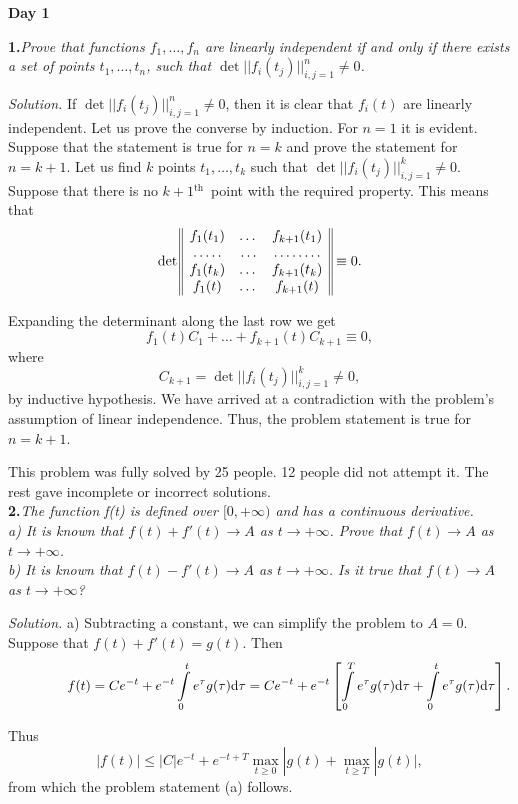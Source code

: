 \documentclass[12pt]{amsart}
\renewcommand{\th}{$^\text{th}$~}
\begin{document}
\centerline{\textbf{Day 1}}

\textbf{1.}\quad\textit{Prove that functions $f_1,\dots,f_n$ are linearly
independent if and only if there exists a set of points $t_1,\dots,t_n$, such
that $\det||f_i(t_j)||_{i,j=1}^n\neq0$.}

\textit{Solution.}
If $\det||f_i(t_j)||_{i,j=1}^n\neq0$, then it is clear that $f_i(t)$ are
linearly independent.
Let us prove the converse by induction.
For $n=1$ it is evident.
Suppose that the statement is true for $n=k$ and prove the statement for
$n=k+1$.
Let us find $k$ points $t_1,\dots,t_k$ such that
$\det||f_i(t_j)||_{i,j=1}^k\neq0$.
Suppose that there is no $k+1$\th point with the required property.
This means that
$$\det
\begin{array}{||ccc||}
f_1(t_1)&\dots&f_{k+1}(t_1)\\
\dotfill&\dotfill&\dotfill\\
f_1(t_k)&\dots&f_{k+1}(t_k)\\
f_1(t)&\dots&f_{k+1}(t)
\end{array}
\equiv0.$$

Expanding the determinant along the last row we get
$$f_1(t)C_1+\dots+f_{k+1}(t)C_{k+1}\equiv0,$$
where
$$C_{k+1}=\det||f_i(t_j)||_{i,j=1}^k\neq0,$$
by inductive hypothesis.
We have arrived at a contradiction with the problem's assumption of linear
independence.
Thus, the problem statement is true for $n=k+1$.

This problem was fully solved by 25 people.
12 people did not attempt it.
The rest gave incomplete or incorrect solutions.\\

\textbf{2.}\quad\textit{The function f(t) is defined over $[0,+\infty)$ and has a
continuous derivative.\\\indent
a) It is known that $f(t)+f'(t)\to A$ as $t\to+\infty$.
Prove that $f(t)\to A$ as $t\to+\infty$.\\\indent
b) It is known that $f(t)-f'(t)\to A$ as $t\to+\infty$.
Is it true that $f(t)\to A$ as $t\to+\infty$?}

\textit{Solution.}
a) Subtracting a constant, we can simplify the problem to $A=0$.
Suppose that $f(t)+f'(t)=g(t)$.
Then
$$\hspace{10ex}f(t)=Ce^{-t}+e^{-t}\int\limits_0^te^\tau g(\tau)
\text d\tau=Ce^{-t}+e^{-t}\left[\int\limits_0^Te^\tau g(\tau)
\text d\tau+\int\limits_0^te^\tau g(\tau)\text d\tau\right].$$

\quad Thus
$$|f(t)|\leq|C|e^{-t}+e^{-t+T}\max\limits_{t\geq0}|g(t)+
\max\limits_{t\geq T}|g(t)|,$$
from which the problem statement (a) follows.
\end{document}
